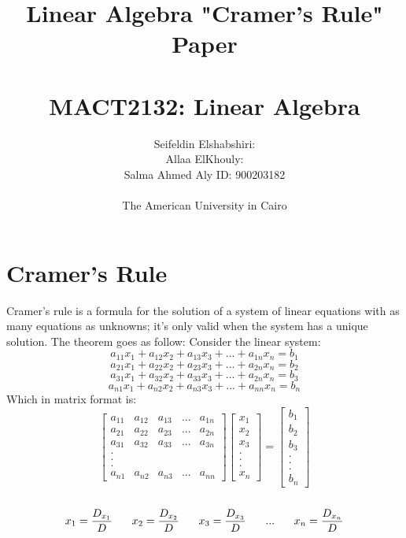 \documentclass{article}
\title{\textbf{Linear Algebra "Cramer's Rule" Paper\\ ~ \\ MACT2132: Linear Algebra}}
\author{Seifeldin Elshabshiri: \\Allaa ElKhouly:  \\ Salma Ahmed Aly ID: 900203182 \\ ~ \\ The American University in Cairo}
\date{}
\theoremstyle{plain}
\begin{document}
\maketitle
\newpage
\section*{Cramer's Rule}

Cramer's rule is a formula for the solution of a system of linear equations with as many equations as unknowns; it’s only valid when the system has a unique solution. The theorem goes as follow:
Consider the linear system:
\[ a_{11}x_1 + a_{12}x_2 + a_{13}x_3 + ... + a_{1n}x_n = b_1 \]
\[ a_{21}x_1 + a_{22}x_2 + a_{23}x_3 + ... + a_{2n}x_n = b_2 \]
\[ a_{31}x_1 + a_{32}x_2 + a_{33}x_3 + ... + a_{2n}x_n = b_3 \]
\[ a_{n1}x_1 + a_{n2}x_2 + a_{n3}x_3 + ... + a_{nn}x_n = b_n \]
Which in matrix format is:
\[\begin{bmatrix}
a_{11} & a_{12} & a_{13} & ... & a_{1n}\\
a_{21} & a_{22} & a_{23} & ... & a_{2n}\\
a_{31} & a_{32} & a_{33} & ... & a_{3n}\\
.\\
.\\
.\\
a_{n1} & a_{n2} & a_{n3} & ... & a_{nn}
\end{bmatrix}
\begin{bmatrix}
x_1\\
x_2\\
x_3\\
.\\
.\\
.\\
x_n
\end{bmatrix}
=
\begin{bmatrix}
b_1\\
b_2\\
b_3\\
.\\
.\\
.\\
b_n
\end{bmatrix}\]\\
\[x_1 = \frac{D_{x_1}}{D} \color{white}text\color{black} x_2 = \frac{D_{x_2}}{D}\color{white}text\color{black}x_3 = \frac{D_{x_3}}{D}\color{white}text\color{black}...\color{white}text\color{black}x_n = \frac{D_{x_n}}{D}\]
\end{document}
